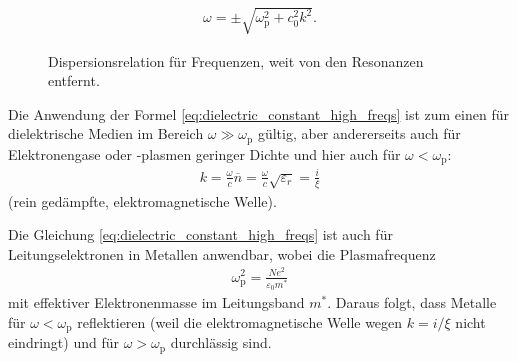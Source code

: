 \begin{itemize}
\begin{align*}
              \omega=\pm\sqrt{\omega_\mathrm{p}^2+c_0^2k^2}.
          \end{align*}
          \begin{figure}[htb]
              \centering
              \tfigDispersionRelationLosslessMedium
              \caption{Dispersionsrelation für Frequenzen, weit von den Resonanzen entfernt. }
              \label{fig:dispersion_relation_lossless_medium}
          \end{figure}
          Die Anwendung der Formel \eqref{eq:dielectric_constant_high_freqs} ist zum einen für dielektrische Medien im Bereich $\omega\gg\omega_\mathrm{p}$ gültig, aber andererseits auch für Elektronengase oder -plasmen geringer Dichte und hier auch für $\omega<\omega_\mathrm{p}$:
          \begin{align*}
              k=\frac{\omega}{c}\overline{n} = \frac{\omega}{c}\sqrt{\varepsilon_r}=\frac{i}{\xi}
          \end{align*}
          (rein gedämpfte, elektromagnetische Welle).

          Die Gleichung \eqref{eq:dielectric_constant_high_freqs} ist auch für Leitungselektronen in Metallen anwendbar, wobei die Plasmafrequenz
          \begin{align*}
              \omega_\mathrm{p}^2=\frac{Ne^2}{\varepsilon_0m^*}
          \end{align*}
          mit effektiver Elektronenmasse im Leitungsband $m^*$.
          Daraus folgt, dass Metalle für $\omega<\omega_\mathrm{p}$ reflektieren (weil die elektromagnetische Welle wegen $k=i/\xi$ nicht eindringt) und für $\omega>\omega_\mathrm{p}$ durchlässig sind.
\end{itemize}

